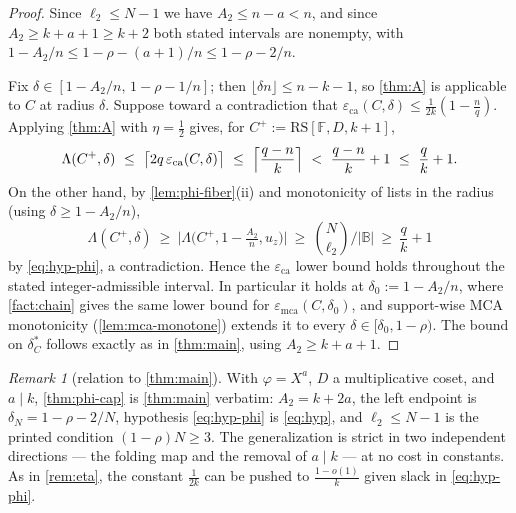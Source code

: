 \documentclass[11pt]{article}
\theoremstyle{definition}
\theoremstyle{remark}
\newtheorem{remark}[remark]{Remark}
\newcommand{\F}{\mathbb{F}}
\newcommand{\B}{\mathbb{B}}
\newcommand{\RS}{\mathrm{RS}}
\newcommand{\eca}{\varepsilon_{\mathrm{ca}}}
\newcommand{\emca}{\varepsilon_{\mathrm{mca}}}
\newcommand{\Lst}{\Lambda}
\begin{document}
\begin{proof}
Since $\ell_2\le N-1$ we have $A_2\le n-a<n$, and since $A_2\ge k+a+1\ge k+2$ both stated intervals are nonempty, with $1-A_2/n\le1-\rho-(a+1)/n\le1-\rho-2/n$.

Fix $\delta\in[1-A_2/n,\,1-\rho-1/n]$; then $\lfloor\delta n\rfloor\le n-k-1$, so \cref{thm:A} is applicable to $C$ at radius $\delta$. Suppose toward a contradiction that $\eca(C,\delta)\le\frac1{2k}(1-\frac nq)$. Applying \cref{thm:A} with $\eta=\frac12$ gives, for $C^+:=\RS[\F,D,k+1]$,
\[
\Lst(C^+,\delta)\ \le\ \bigl\lceil2q\,\eca(C,\delta)\bigr\rceil
\ \le\ \Bigl\lceil\frac{q-n}k\Bigr\rceil
\ <\ \frac{q-n}k+1\ \le\ \frac qk+1 .
\]
On the other hand, by \cref{lem:phi-fiber}(ii) and monotonicity of lists in the radius (using $\delta\ge1-A_2/n$),
\[
\Lst(C^+,\delta)\ \ge\ \bigl|\Lst\bigl(C^+,1-\tfrac{A_2}n,u_z\bigr)\bigr|\ \ge\ \binom N{\ell_2}\Big/|\B|\ \ge\ \frac qk+1
\]
by \eqref{eq:hyp-phi}, a contradiction. Hence the $\eca$ lower bound holds throughout the stated integer-admissible interval. In particular it holds at $\delta_0:=1-A_2/n$, where \cref{fact:chain} gives the same lower bound for $\emca(C,\delta_0)$, and support-wise MCA monotonicity (\cref{lem:mca-monotone}) extends it to every $\delta\in[\delta_0,1-\rho)$. The bound on $\delta^*_C$ follows exactly as in \cref{thm:main}, using $A_2\ge k+a+1$.
\end{proof}

\begin{remark}[relation to \cref{thm:main}]\label{rem:phi-cap-scope}
With $\varphi=X^a$, $D$ a multiplicative coset, and $a\mid k$, \cref{thm:phi-cap} is \cref{thm:main} verbatim: $A_2=k+2a$, the left endpoint is $\delta_N=1-\rho-2/N$, hypothesis \eqref{eq:hyp-phi} is \eqref{eq:hyp}, and $\ell_2\le N-1$ is the printed condition $(1-\rho)N\ge3$. The generalization is strict in two independent directions --- the folding map and the removal of $a\mid k$ --- at no cost in constants. As in \cref{rem:eta}, the constant $\frac1{2k}$ can be pushed to $\frac{1-o(1)}k$ given slack in \eqref{eq:hyp-phi}.
\end{remark}
\end{document}
